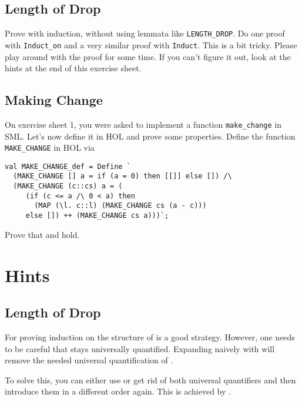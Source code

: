 \documentclass[a4paper,10pt,oneside]{scrartcl}
\begin{document}
\subsection{Length of Drop}

Prove  with induction, \ie
without using lemmata like \texttt{LENGTH\_DROP}. Do one proof with \texttt{Induct\_on} and a very similar proof with \texttt{Induct}. This is a bit tricky.
Please play around with the proof for some time. If you can't figure it out, look at the hints at the end of this exercise sheet.


\subsection{Making Change}

On exercise sheet 1, you were asked to implement a function \texttt{make\_change} in SML. Let's now define it in HOL and prove some properties. Define the function \texttt{MAKE\_CHANGE} in HOL via

\begin{verbatim}
val MAKE_CHANGE_def = Define `
  (MAKE_CHANGE [] a = if (a = 0) then [[]] else []) /\
  (MAKE_CHANGE (c::cs) a = (
     (if (c <= a /\ 0 < a) then
       (MAP (\l. c::l) (MAKE_CHANGE cs (a - c)))
     else []) ++ (MAKE_CHANGE cs a)))`;
\end{verbatim}

Prove that  and
 hold.


\section{Hints}

\subsection{Length of Drop}

For proving  induction on
the structure of \hol{l2} is a good strategy. However, one needs to be careful that  stays
universally quantified. Expanding naively with \hol{GEN\_TAC >> Induct} will
remove the needed universal quantification of \hol{l1}. 

To solve this, you can either use  or get rid of both universal quantifiers and then introduce them in a different order again. This is achieved by .
\end{document}
